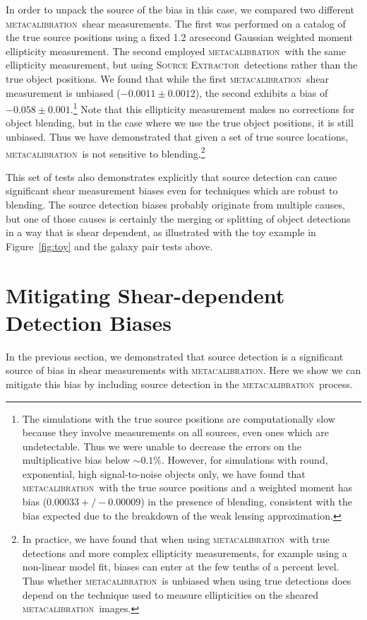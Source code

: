 \documentclass[iop, twocolappendix, appendixfloats, numberedappendix, apj]{hackemulateapj}
\newcommand{\mcal}{\textsc{metacalibration}}
\newcommand{\sx}{\textsc{Source Extractor}}
\begin{document}
In order to unpack the source of the bias in this case, we compared two
different \mcal\ shear measurements. The first was performed on a catalog of the true
source positions using a fixed 1.2 arcsecond Gaussian weighted moment
ellipticity measurement. The second employed \mcal\ with the same ellipticity
measurement, but using \sx\ detections rather than the true object positions. We
found that while the first \mcal\ shear measurement is unbiased
($-0.0011\pm0.0012$), the second exhibits a bias of
$-0.058\pm0.001$.\footnote{The simulations with the true source positions are
computationally slow because they involve measurements on all sources, even
ones which are undetectable. Thus we were unable to decrease the errors on the
multiplicative bias below $\sim0.1\%$. However, for simulations with round,
exponential, high signal-to-noise objects only, we have found that \mcal\ with
the true source positions and a weighted moment has bias ($0.00033 +/-
0.00009$) in the presence of blending, consistent with the bias expected due to
the breakdown of the weak lensing approximation.} Note that this ellipticity
measurement makes no corrections for object blending, but in the case where we
use the true object positions, it is still unbiased. Thus we have demonstrated
that given a set of true source locations, \mcal\ is not sensitive to
blending.\footnote{In practice, we have found that when using \mcal\ with true
detections and more complex ellipticity measurements, for example using a
non-linear model fit, biases can enter at the few tenths of a percent level.
Thus whether \mcal\ is unbiased when using true detections does depend on the
technique used to measure ellipticities on the sheared \mcal\ images.}

This set of tests also demonstrates explicitly that source detection can cause
significant shear measurement biases even for techniques which are robust to
blending. The source detection biases probably originate from multiple causes,
but one of those causes is certainly the merging or splitting of object detections
in a way that is shear dependent, as illustrated with the toy example in
Figure~\ref{fig:toy} and the galaxy pair tests above.

\section{Mitigating Shear-dependent Detection Biases} \label{sec:mitigate}

In the previous section, we demonstrated that source detection is a significant
source of bias in shear measurements with \mcal. Here we show we can
mitigate this bias by including source detection in the
\mcal\ process.
\end{document}
